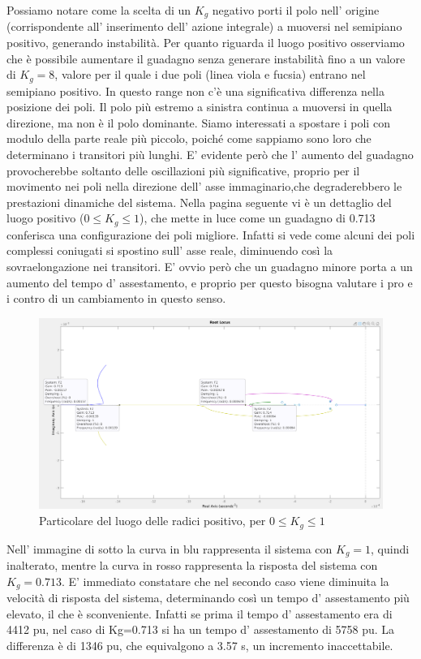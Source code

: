 \documentclass[Lau,noexaminfo]{sapthesis}
\begin{document}
	Possiamo notare come la scelta di un $K_g$ negativo porti il polo nell' origine (corrispondente all' inserimento dell' azione integrale) a muoversi nel semipiano positivo, generando instabilità. Per quanto riguarda il luogo positivo osserviamo che è possibile aumentare il guadagno senza generare instabilità fino a un valore di $K_g=8$, valore per il quale i due poli (linea viola e fucsia) entrano nel semipiano positivo. In questo range non c'è una significativa differenza nella posizione dei poli. Il polo più estremo a sinistra continua a muoversi in quella direzione, ma non è il polo dominante. Siamo interessati a spostare i poli con modulo della parte reale più piccolo, poiché come sappiamo sono loro che determinano i transitori più lunghi. E' evidente però che l' aumento del guadagno provocherebbe soltanto delle oscillazioni più significative, proprio per il movimento nei poli nella direzione dell' asse immaginario,che degraderebbero le prestazioni dinamiche del sistema.
	Nella pagina seguente vi è un dettaglio del luogo positivo ($0\le K_g\le 1$), che mette in luce come un guadagno di 0.713 conferisca una configurazione dei poli migliore. Infatti si vede come alcuni dei poli complessi coniugati si spostino sull' asse reale, diminuendo così la sovraelongazione nei transitori. E' ovvio però che un guadagno minore porta a un aumento del tempo d' assestamento, e proprio per questo bisogna valutare i pro e i contro di un cambiamento in questo senso.
	\begin{figure}
		\centering
		\includegraphics[scale=0.255]{rlocus_F2_particolare}
		\caption{Particolare del luogo delle radici positivo, per $0\le K_g\le 1$}
	\end{figure}
	Nell' immagine di sotto la curva in blu rappresenta il sistema con $K_g=1$, quindi inalterato, mentre la curva in rosso rappresenta la risposta del sistema con $K_g=0.713$. E' immediato constatare che nel secondo caso viene diminuita la velocità di risposta del sistema, determinando così un tempo d' assestamento più elevato, il che è sconveniente. Infatti se prima il tempo d' assestamento era di 4412 pu, nel caso di Kg=0.713 si ha un tempo d' assestamento di 5758 pu. La differenza è di 1346 pu, che equivalgono a 3.57 s, un incremento inaccettabile.
\end{document}
